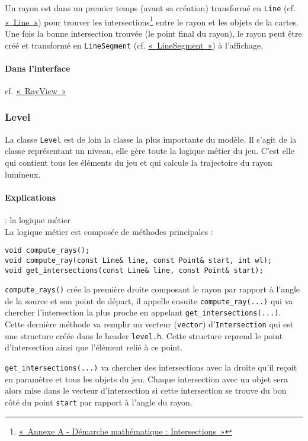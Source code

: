 \documentclass[]{report}
\begin{document}
Un rayon est dans un premier temps (avant sa création) transformé en \texttt{Line} (cf. \hyperref[Line]{«~Line~»}) pour
trouver les intersections\footnote{\hyperref[AnnexeIntersects]{«~Annexe A - Démarche mathématique : Intersections~»}} entre le rayon et les objets de la cartes. Une fois la bonne intersection trouvée (le point final du rayon), le rayon peut être créé et 
transformé en \texttt{LineSegment} (cf. \hyperref[LineSegment]{«~LineSegment~»}) à l'affichage.

\paragraph{Dans l'interface} cf. \hyperref[RayView]{«~RayView~»}

\newpage
\subsubsection{\label{Level}Level}

La classe \texttt{Level} est de loin la classe la plus importante du modèle.
Il s'agit de la classe représentant un niveau, elle gère toute la logique métier
du jeu. C'est elle qui contient tous les éléments du jeu et qui calcule
la trajectoire du rayon lumineux.

\paragraph{Explications} : la logique métier \\

La logique métier est composée de méthodes principales : 

\begin{lstlisting}
void compute_rays();
void compute_ray(const Line& line, const Point& start, int wl);
void get_intersections(const Line& line, const Point& start);
\end{lstlisting}

\texttt{compute\_rays()} crée la première droite composant le rayon par rapport à l'angle de la 
source et son point de départ, il appelle ensuite \texttt{compute\_ray(...)} qui va chercher
l'intersection la plus proche en appelant \texttt{get\_intersections(...)}. Cette dernière méthode
va remplir un vecteur (\texttt{vector}) d'\texttt{Intersection} qui est une structure créée dans 
le header \texttt{level.h}. Cette structure reprend le point d'intersection ainsi que l'élément relié à ce point.

\texttt{get\_intersections(...)} va chercher des intersections avec la droite qu'il reçoit en paramètre
et tous les objets du jeu. Chaque intersection avec un objet sera alors mise dans le vecteur d'intersection
si cette intersection se trouve du bon côté du point \texttt{start} par rapport à l'angle du rayon.
\end{document}
